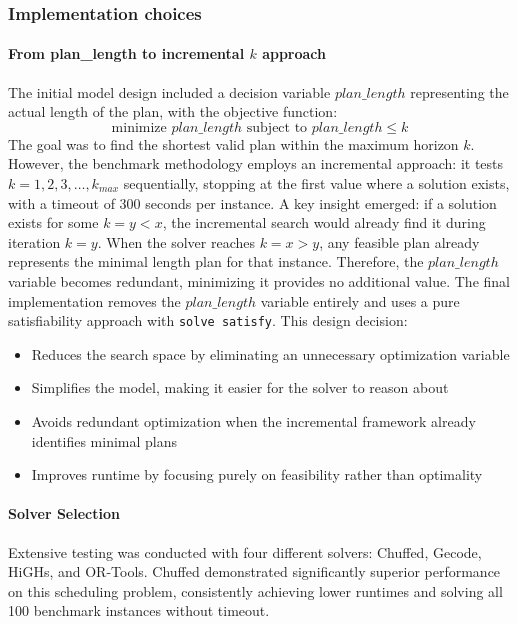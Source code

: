 \documentclass[a4paper,12pt]{article}
\begin{document}
\subsubsection{Implementation choices}

\paragraph{From plan\_length to incremental $k$ approach}
The initial model design included a decision variable $plan\_length$ representing the actual length of the plan, with the objective function:
$$\text{minimize } plan\_length \text{ subject to } plan\_length \le k$$
The goal was to find the shortest valid plan within the maximum horizon $k$. However, the benchmark methodology employs an incremental approach: it tests $k=1, 2, 3, \ldots, k_{max}$ sequentially, stopping at the first value where a solution exists, with a timeout of 300 seconds per instance. A key insight emerged: if a solution exists for some $k=y < x$, the incremental search would already find it during iteration $k=y$. When the solver reaches $k=x > y$, any feasible plan already represents the minimal length plan for that instance. Therefore, the $plan\_length$ variable becomes redundant, minimizing it provides no additional value. The final implementation removes the $plan\_length$ variable entirely and uses a pure satisfiability approach with \texttt{solve satisfy}. This design decision:
\begin{itemize}
    \item Reduces the search space by eliminating an unnecessary optimization variable
    \item Simplifies the model, making it easier for the solver to reason about
    \item Avoids redundant optimization when the incremental framework already identifies minimal plans
    \item Improves runtime by focusing purely on feasibility rather than optimality
\end{itemize}

\paragraph{Solver Selection}
Extensive testing was conducted with four different solvers: Chuffed, Gecode, HiGHs, and OR-Tools. Chuffed demonstrated significantly superior performance on this scheduling problem, consistently achieving lower runtimes and solving all 100 benchmark instances without timeout.
\end{document}
